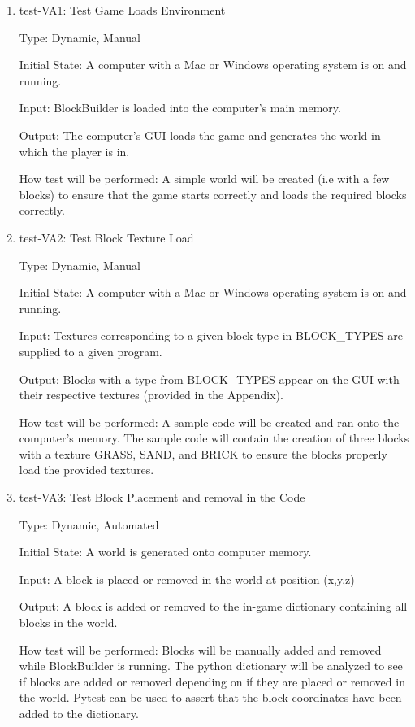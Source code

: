 \documentclass[12pt, titlepage]{article}
\begin{document}
\begin{enumerate}

\item{test-VA1: Test Game Loads Environment\\}

Type: Dynamic, Manual
					
Initial State: A computer with a Mac or Windows operating system is on and running.
					
Input: BlockBuilder is loaded into the computer's main memory.
					
Output: The computer's GUI loads the game and generates the world in which the player is in.
					
How test will be performed: A simple world will be created (i.e with a few blocks) to ensure that the game starts correctly and loads the required blocks correctly.

					
\item{test-VA2: Test Block Texture Load\\}

Type: Dynamic, Manual
					
Initial State: A computer with a Mac or Windows operating system is on and running.
					
Input: Textures corresponding to a given block type in BLOCK\_TYPES are supplied to a given program.
					
Output: Blocks with a  type from BLOCK\_TYPES appear on the GUI with their respective textures (provided in the Appendix).
					
How test will be performed: A sample code will be created and ran onto the computer's memory. The sample code will contain the creation of three blocks with a texture GRASS, SAND, and BRICK to ensure the blocks properly load the provided textures.

\item{test-VA3: Test Block Placement and removal in the Code\\}

Type: Dynamic, Automated
					
Initial State: A world is generated onto computer memory.
					
Input: A block is placed or removed in the world at position (x,y,z)
					
Output: A block is added or removed to the in-game dictionary containing all blocks in the world.
					
How test will be performed: Blocks will be manually added and removed while BlockBuilder is running. The python dictionary will be analyzed to see if blocks are added or removed depending on if they are placed or removed in the world. Pytest can be used to assert that the block coordinates have been added to the dictionary.

\end{enumerate}
\end{document}
